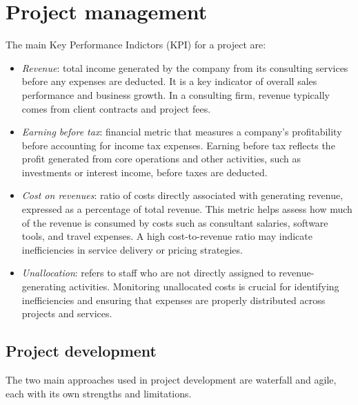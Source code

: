 \section{Project management}

The main Key Performance Indictors (KPI) for a project are: 
\begin{itemize}
    \item \textit{Revenue}: total income generated by the company from its consulting services before any expenses are deducted.
        It is a key indicator of overall sales performance and business growth. 
        In a consulting firm, revenue typically comes from client contracts and project fees.
    \item \textit{Earning before tax}: financial metric that measures a company's profitability before accounting for income tax expenses.
        Earning before tax reflects the profit generated from core operations and other activities, such as investments or interest income, before taxes are deducted.
    \item \textit{Cost on revenues}: ratio of costs directly associated with generating revenue, expressed as a percentage of total revenue.
        This metric helps assess how much of the revenue is consumed by costs such as consultant salaries, software tools, and travel expenses. 
        A high cost-to-revenue ratio may indicate inefficiencies in service delivery or pricing strategies.
    \item \textit{Unallocation}: refers to staff who are not directly assigned to revenue-generating activities. 
        Monitoring unallocated costs is crucial for identifying inefficiencies and ensuring that expenses are properly distributed across projects and services.
\end{itemize}



\subsection{Project development}
The two main approaches used in project development are waterfall and agile, each with its own strengths and limitations.


